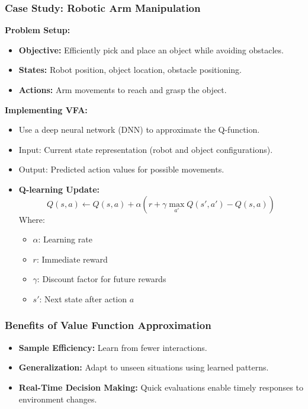 \documentclass[aspectratio=169]{beamer}
\begin{document}
\begin{frame}[fragile]
    \frametitle{Case Study: Robotic Arm Manipulation}
    \textbf{Problem Setup:}
    \begin{itemize}
        \item \textbf{Objective:} Efficiently pick and place an object while avoiding obstacles.
        \item \textbf{States:} Robot position, object location, obstacle positioning.
        \item \textbf{Actions:} Arm movements to reach and grasp the object.
    \end{itemize}

    \textbf{Implementing VFA:}
    \begin{itemize}
        \item Use a deep neural network (DNN) to approximate the Q-function.
        \item Input: Current state representation (robot and object configurations).
        \item Output: Predicted action values for possible movements.
        \item \textbf{Q-learning Update:}
        \begin{equation}
            Q(s, a) \gets Q(s, a) + \alpha \left( r + \gamma \max_{a'} Q(s', a') - Q(s, a) \right)
        \end{equation}
        Where:
        \begin{itemize}
            \item $ \alpha $: Learning rate
            \item $ r $: Immediate reward
            \item $ \gamma $: Discount factor for future rewards
            \item $ s' $: Next state after action $ a $
        \end{itemize}
    \end{itemize}
\end{frame}

\begin{frame}[fragile]
    \frametitle{Benefits of Value Function Approximation}
    \begin{itemize}
        \item \textbf{Sample Efficiency:} Learn from fewer interactions.
        \item \textbf{Generalization:} Adapt to unseen situations using learned patterns.
        \item \textbf{Real-Time Decision Making:} Quick evaluations enable timely responses to environment changes.
    \end{itemize}
\end{frame}
\end{document}
